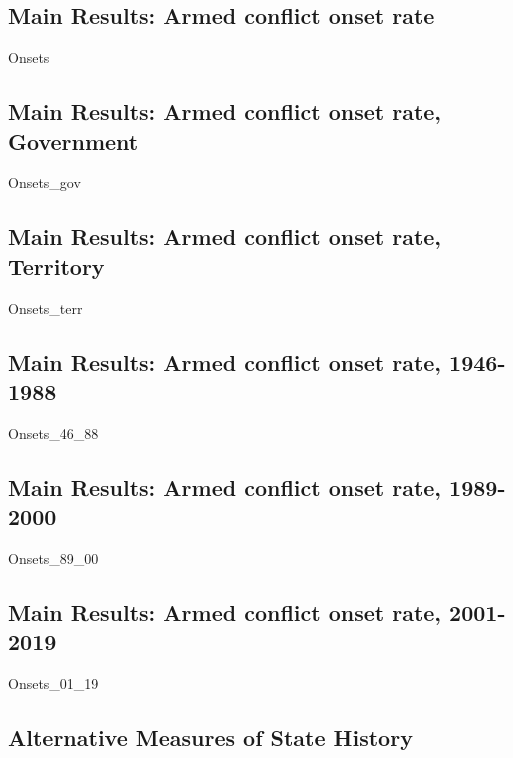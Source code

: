 \subsection{Main Results: Armed conflict onset rate}

    {Onsets}
    
\clearpage    

\subsection{Main Results: Armed conflict onset rate, Government}

    {Onsets_gov}
    
        
\clearpage    
  
\subsection{Main Results: Armed conflict onset rate, Territory}

    {Onsets_terr}
    
    
\clearpage        

\subsection{Main Results: Armed conflict onset rate, 1946-1988}

    {Onsets_46_88}
 
    
\clearpage     
  
\subsection{Main Results: Armed conflict onset rate, 1989-2000}

    {Onsets_89_00}
    
    
\clearpage    


\subsection{Main Results: Armed conflict onset rate, 2001-2019}

    {Onsets_01_19}
    
    
\clearpage    

\subsection{Alternative Measures of State History}

